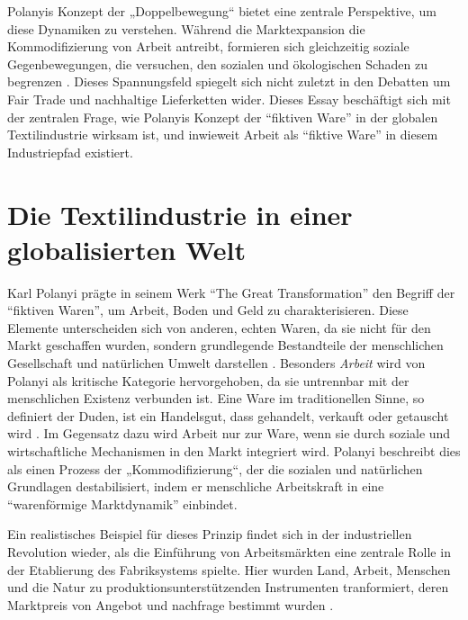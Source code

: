\documentclass[12pt]{article}
\begin{document}
Polanyis Konzept der „Doppelbewegung“ bietet eine zentrale Perspektive, um diese Dynamiken zu verstehen. Während die Marktexpansion die Kommodifizierung von Arbeit antreibt, formieren sich gleichzeitig soziale Gegenbewegungen, die versuchen, den sozialen und ökologischen Schaden zu begrenzen \autocite[123]{polanyi_levitt_transformations_2019}. Dieses Spannungsfeld spiegelt sich nicht zuletzt in den Debatten um Fair Trade und nachhaltige Lieferketten wider. Dieses Essay beschäftigt sich mit der zentralen Frage, wie Polanyis Konzept der \enquote{fiktiven Ware} in der globalen Textilindustrie wirksam ist, und inwieweit Arbeit als \enquote{fiktive Ware} in diesem Industriepfad existiert.

\section{Die Textilindustrie in einer globalisierten Welt}
Karl Polanyi prägte in seinem Werk \enquote{The Great Transformation} den Begriff der \enquote{fiktiven Waren}, um Arbeit, Boden und Geld zu charakterisieren. Diese Elemente unterscheiden sich von anderen, echten Waren, da sie nicht für den Markt geschaffen wurden, sondern grundlegende Bestandteile der menschlichen Gesellschaft und natürlichen Umwelt darstellen \autocite[181]{ebner_karl_2021}.
Besonders \textit{Arbeit} wird von Polanyi als kritische Kategorie hervorgehoben, da sie untrennbar mit der menschlichen Existenz verbunden ist. Eine Ware im traditionellen Sinne, so definiert der Duden, ist ein Handelsgut, dass gehandelt, verkauft oder getauscht wird \autocite[vgl.][]{duden_ware_nodate}. Im Gegensatz dazu wird Arbeit nur zur Ware, wenn sie durch soziale und wirtschaftliche Mechanismen in den Markt integriert wird. Polanyi beschreibt dies als einen Prozess der „Kommodifizierung“, der die sozialen und natürlichen Grundlagen destabilisiert, indem er menschliche Arbeitskraft in eine \enquote{warenförmige Marktdynamik} \autocite[181]{ebner_karl_2021} einbindet.

Ein realistisches Beispiel für dieses Prinzip findet sich in der industriellen Revolution wieder, als die Einführung von Arbeitsmärkten eine zentrale Rolle in der Etablierung des Fabriksystems spielte. Hier wurden Land, Arbeit, Menschen und die Natur zu produktionsunterstützenden Instrumenten tranformiert, deren Marktpreis von Angebot und nachfrage bestimmt wurden \autocite[122]{polanyi_levitt_transformations_2019}. 
\end{document}
